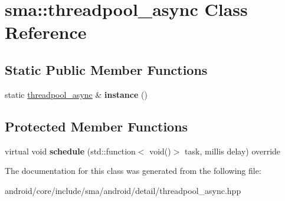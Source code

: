 \hypertarget{classsma_1_1threadpool__async}{\section{sma\-:\-:threadpool\-\_\-async Class Reference}
\label{classsma_1_1threadpool__async}
}
\subsection*{Static Public Member Functions}
\begin{DoxyCompactItemize}
\item 
\hypertarget{classsma_1_1threadpool__async_a3645247c7b43a21780d5d84f3988b56d}{static \hyperlink{classsma_1_1threadpool__async}{threadpool\-\_\-async} \& {\bfseries instance} ()}\label{classsma_1_1threadpool__async_a3645247c7b43a21780d5d84f3988b56d}

\end{DoxyCompactItemize}
\subsection*{Protected Member Functions}
\begin{DoxyCompactItemize}
\item 
\hypertarget{classsma_1_1threadpool__async_ac10309530a51eaaeb8bee3c03e88e5bf}{virtual void {\bfseries schedule} (std\-::function$<$ void()$>$ task, millis delay) override}\label{classsma_1_1threadpool__async_ac10309530a51eaaeb8bee3c03e88e5bf}

\end{DoxyCompactItemize}


The documentation for this class was generated from the following file\-:\begin{DoxyCompactItemize}
\item 
android/core/include/sma/android/detail/threadpool\-\_\-async.\-hpp\end{DoxyCompactItemize}
